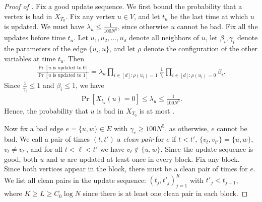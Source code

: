 \documentclass[10pt,a4paper]{amsart}
\renewcommand{\Pr}{\mathop{\mathrm{Pr}}\nolimits}
\begin{document}
\begin{proof}[Proof of ]
Fix a good update sequence.
We first bound the probability that a vertex is bad in $X_{T_0}$. Fix any vertex $u \in V$, and let $t_u$ be the last time at which $u$ is updated. We must have $\lambda_u \leq \frac{1}{100N^5}$, since otherwise $u$ cannot be bad. Fix all the updates before time $t_u$. Let $u_1,u_2,\ldots,u_d$ denote all neighbors of $u$, let $\beta_i,\gamma_i$ denote the parameters of the edge $\{u_i,u\}$, and let $\rho$ denote the configuration of the other variables at time $t_u$. Then
\begin{align}\label{eq:lambda-u-bound}
 \frac{\Pr[ u \text{ is updated to } 0]}{\Pr[u \text{ is updated to }1]} = \lambda_u \prod_{i \in [d]: \rho(u_i) = 1} \frac{1}{\gamma_i}\prod_{i \in [d]: \rho(u_i) = 0} \beta_i.
\end{align}
Since $\frac{1}{\gamma_i} \leq 1$ and $\beta_i \leq 1$, we have
\begin{align*}
 \Pr[X_{t_u}(u) = 0] \leq \lambda_u \leq \frac{1}{100N^5}.
\end{align*}
Hence, the probability that $u$ is bad in $X_{T_0}$ is at most .

Now fix a bad edge $e = \{u,w\} \in E$ with  $\gamma_e \geq 100N^5$, as otherwise, $e$ cannot be bad.
We call a pair of times $(t,t')$ a \emph{clean pair} for $e$ if $t < t'$, $\{v_t,v_{t'}\} = \{u,w\}$, $v_t \neq v_{t'}$, and for all $t < \ell < t'$ we have $v_\ell \notin \{u,w\}$.
Since the update sequence is good, both $u$ and $w$ are updated at least once in every block. Fix any block. %
Since both vertices appear in the block, there must be a clean pair of times for $e$. 
We list all clean pairs in the update sequence: $(t_j,t'_j)_{j=1}^K$ with $t'_j < t_{j+1}$,
where $K \geq L \geq C_0 \log N$ since there is at least one clean pair in each block.


\end{proof}
\end{document}
